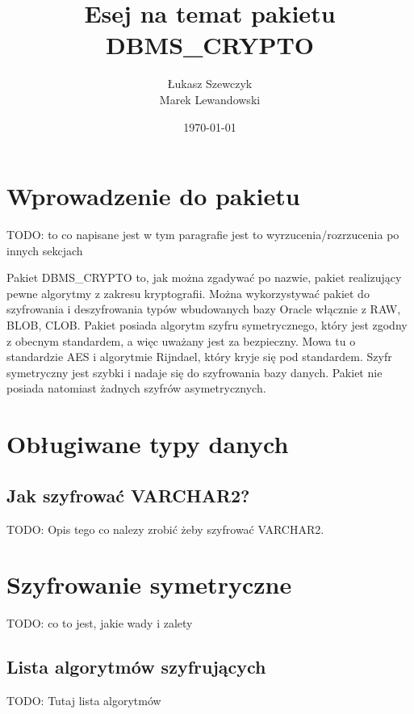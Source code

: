 \documentclass[12pt, a4paper]{article}
\begin{document}
\title{Esej na temat pakietu DBMS\_CRYPTO}
\author{Łukasz Szewczyk\\
		Marek Lewandowski }
\date{\today}



\maketitle


\section{Wprowadzenie do pakietu}
TODO: to co napisane jest w tym paragrafie jest to wyrzucenia/rozrzucenia po
innych sekcjach

 Pakiet DBMS\_CRYPTO to, jak można zgadywać po nazwie, pakiet
realizujący pewne algorytmy z zakresu kryptografii. Można wykorzystywać pakiet do szyfrowania i
deszyfrowania typów wbudowanych bazy Oracle włącznie z RAW, BLOB, CLOB. Pakiet
posiada algorytm szyfru symetrycznego, który jest zgodny z obecnym standardem, a
więc uważany jest za bezpieczny. Mowa tu o standardzie AES i algorytmie
Rijndael, który kryje się pod standardem. Szyfr symetryczny jest szybki i nadaje
się do szyfrowania bazy danych. Pakiet nie posiada natomiast żadnych szyfrów
asymetrycznych.

\section{Obługiwane typy danych}

\subsection{Jak szyfrować VARCHAR2?}
TODO: Opis tego co nalezy zrobić żeby szyfrować VARCHAR2.

\section{Szyfrowanie symetryczne}
TODO: co to jest, jakie wady i zalety



\subsection{Lista algorytmów szyfrujących}
TODO: Tutaj lista algorytmów
\end{document}
